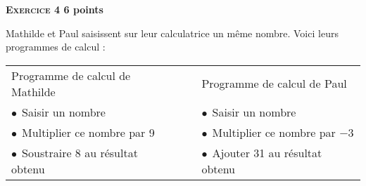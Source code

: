 \textbf{\textsc{Exercice 4} \hfill 6 points}

\medskip

Mathilde et Paul saisissent sur leur calculatrice un même nombre. Voici leurs programmes
de calcul :

\begin{center}
\begin{tabularx}{\linewidth}{|X|m{}|X|}
\multicolumn{1}{l}{Programme de calcul de Mathilde}&\multicolumn{1}{l}{~}&\multicolumn{1}{l}{Programme de calcul de Paul}\\\cline{1-1}\cline{3-3}
$\bullet~~$Saisir un nombre&&$\bullet~~$Saisir un nombre\\
$\bullet~~$Multiplier ce nombre par 9&&$\bullet~~$Multiplier ce nombre par $- 3$\\
$\bullet~~$Soustraire 8 au résultat obtenu&&$\bullet~~$Ajouter 31 au résultat obtenu\\\cline{1-1}\cline{3-3}
\end{tabularx}
\end{center}

\medskip

